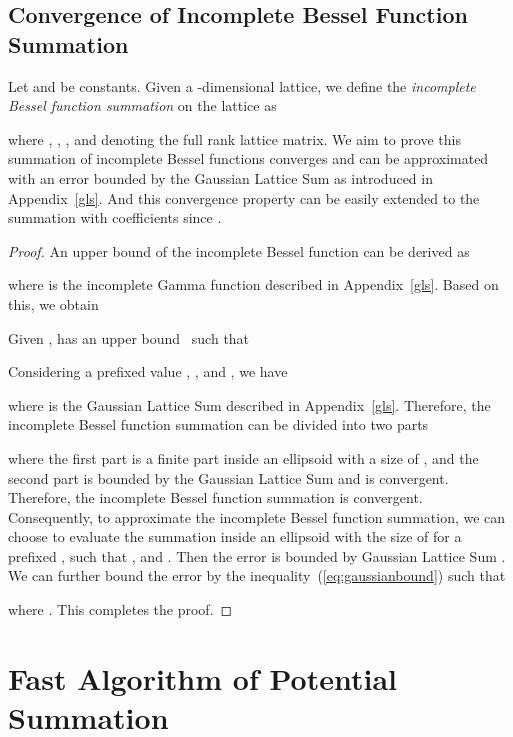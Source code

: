 \documentclass[nohyperref]{article}
\theoremstyle{plain}
\theoremstyle{definition}
\theoremstyle{remark}
\begin{document}
\subsection{Convergence of Incomplete Bessel Function Summation}
\label{besselconverge}

Let  and be constants. Given a -dimensional lattice, we define the \textit{incomplete Bessel function summation} on the lattice as

where , , ,  and  denoting the full rank lattice matrix. We aim to prove this summation of incomplete Bessel functions converges and can be approximated with an error bounded by the Gaussian Lattice Sum as introduced in Appendix~\ref{gls}. And this convergence property can be easily extended to the summation with  coefficients since .
\begin{proof} An upper bound of the incomplete Bessel function can be derived as

where  is the incomplete Gamma function described in Appendix~\ref{gls}. Based on this, we obtain

Given ,  has an upper bound~\citep{gamma} such that

Considering a prefixed value , ,  and , we have

where  is the Gaussian Lattice Sum described in Appendix~\ref{gls}. Therefore, the incomplete Bessel function summation can be divided into two parts

where the first part is a finite part inside an ellipsoid with a size of , and the second part  is bounded by the Gaussian Lattice Sum  and is convergent. Therefore, the incomplete Bessel function summation is convergent. Consequently, to approximate the incomplete Bessel function summation, we can choose to evaluate the summation inside an ellipsoid with the size of  for a prefixed , such that ,  and . Then the error  is bounded by Gaussian Lattice Sum . We can further bound the error by the inequality~(\ref{eq:gaussianbound}) such that 

where . This completes the proof.
\end{proof}


\section{Fast Algorithm of Potential Summation}
\end{document}
